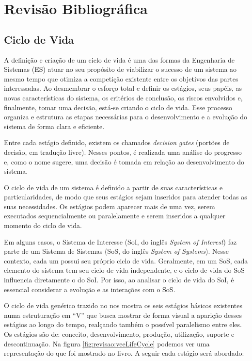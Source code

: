 
\chapter{Revisão Bibliográfica}\label{chap:revisao}

\section{Ciclo de Vida}\label{sec:revisao:ciclodevida}

	A definição e criação de um ciclo de vida é uma das formas da Engenharia de Sistemas (ES) atuar no seu propósito de viabilizar o sucesso de um sistema ao
	mesmo tempo que otimiza a competição existente entre os objetivos das partes interessadas. Ao desmembrar o esforço total e definir os estágios, seus papéis, as novas características do sistema, os critérios de conclusão, os riscos envolvidos e, finalmente, tomar uma decisão, está-se criando o ciclo de vida. Esse processo organiza e estrutura as etapas necessárias para o desenvolvimento e a evolução do sistema de forma clara e eficiente.

	Entre cada estágio definido, existem os chamados \textit{decision gates} (portões de decisão, em tradução livre). Nesses pontos, é realizada uma análise do progresso e, como o nome sugere, uma decisão é tomada em relação ao desenvolvimento do sistema.

	O ciclo de vida de um sistema é definido a partir de suas características e particularidades, de modo que seus estágios sejam inseridos para atender todas as suas
	necessidades. Os estágios podem aparecer mais de uma vez, serem executados sequencialmente ou paralelamente e serem inseridos a qualquer momento do ciclo de vida.

	Em alguns casos, o Sistema de Interesse (SoI, do inglês \textit{System of Interest}) faz parte de um Sistema de Sistemas (SoS, do inglês \textit{System of Systems}). Nesse contexto, cada um possui seu próprio ciclo de vida. Geralmente, em um SoS, cada elemento do sistema tem seu ciclo de vida independente, e o ciclo de vida do SoS influencia diretamente o do SoI. Por isso, ao analisar o ciclo de vida do SoI, é essencial considerar a evolução e as interações com o SoS.

	O ciclo de vida genérico trazido no \cite{incoseHandbook} nos mostra os seis estágios básicos existentes numa estruturação em ``V'' que busca mostrar de forma visual a aparição desses estágios
	ao longo do tempo, realçando também o possível paralelismo entre eles. Os estágios são de: conceito, desenvolvimento, produção, utilização, suporte e descontinuação. Na figura \ref{fig:revisao:veeLifeCycle} podemos ver uma representação do que foi mostrado no livro. A seguir cada estágio será abordado:

